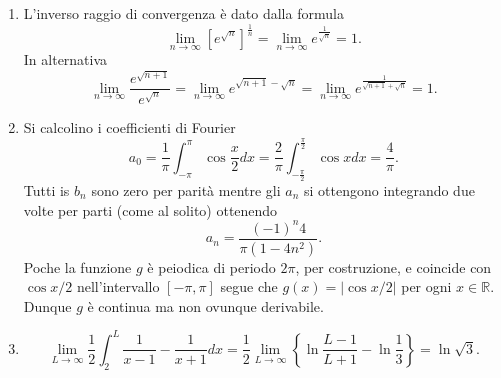 \documentclass{report}
\newcommand\R{{\mathbb R}}
\newcommand\Or{{\mathcal O}}
\begin{document}
\begin{enumerate}
Dunque
\begin{equation}\label{eq:f2}
\Delta(N,\infty)=\frac 1{2\sqrt N}+\frac 1{24 N^{\frac
32}}+\Or\left(\frac {27}{128 (N-1)^{\frac 52}}\right)
\end{equation}
per cui
\[
\Delta(16,\infty)=\frac 1{2\sqrt 16}+\frac 1{24\times 16^{\frac 32}}+{\mathcal
O}(2.5 \times 10^{-4})
\]
e, sommando a mano i primi quindici termini, si ottiene
\begin{equation}\label{eq:f3}
\Delta(1,\infty)=0.53965+{\mathcal O}(2.5 \times 10^{-4}).
\end{equation}
Finalmente, collezionando le uguaglianze \eqref{eq:f1}, \eqref{eq:f2},
\eqref{eq:f3}, possiamo scrivere 
\begin{align*}
\sum_{n=1}^N \frac 1{\sqrt n}=&2\sqrt{N+1}-2
+0.53965-\frac1{2\sqrt{N+1}}-\frac 1{24 (N+1)^{\frac 32}}\\
&\ +{\mathcal
O}(\frac{27}{128 N^{\frac 52}}+2.5 \times 10^{-4}) .
\end{align*}
Dunque si ha
\begin{align*}
\sum_{n=1}^{250730} \frac 1{\sqrt n}&=000.99958+{\mathcal O}(2.6\times 10^{-4})\\
\sum_{n=1}^{250731} \frac 1{\sqrt n}&=1000.0016+{\mathcal O}(2.6\times 10^{-4}) .
\end{align*}
Si pu\`o quindi affermare che l'intero per cui la somma \`e, per la prima volta, pi\`u
grande di 1000 \`e $\bar N=250731$.\footnote{Se volete una verifica
indipendente, potete scrivere un
piccolo programma (nel vostro linguaggio di programmazione preferito)
che trova $\bar N$ sommando e fermandosi quando la 
somma \`e maggiore di $1000$. Notate comunque che se invece di mille
il limite da superare fosse $10^9$ allora $\bar N$ sarebbe dell'ordine
di grandezza di $10^{18}$ e difficilmente un calcolatore potrebbe fare
$10^{18}$ estrazioni di radici quadrate, inversioni e somme nell'arco
della vostra vita, mentre una semplice sofisticazione del metodo sopra
descritto vi darebbe la risposta con poche ore di calcolo.}

\item L'inverso  raggio di convergenza \`e dato dalla formula
\[
\lim_{n\to \infty}[e^{\sqrt n}]^{\frac 1n}=\lim_{n\to \infty} e^{\frac
1{\sqrt n}}=1.
\]
In alternativa
\[
\lim_{n\to\infty} \frac{e^{\sqrt{n+1}}}{e^{\sqrt n}}=\lim_{n\to\infty}
e^{\sqrt{n+1}-\sqrt n} =\lim_{n\to\infty}e^{\frac1{\sqrt{n+1}+\sqrt
n}}=1.
\]
\item Si calcolino i coefficienti di Fourier
\[
a_0=\frac 1\pi\int_{-\pi}^\pi \cos\frac x2 dx=\frac 2\pi\int_{-\frac
\pi 2}^{\frac \pi 2}\cos x dx=\frac 4\pi.
\]
Tutti is $b_n$ sono zero per parit\`a mentre gli $a_n$ si ottengono
integrando due volte per parti (come al solito) ottenendo
\[
a_n=\frac {(-1)^n 4}{\pi (1-4n^2)}.
\]
Poche la funzione $g$ \`e peiodica di periodo $2\pi$, per costruzione,
e coincide con $\cos x/2$ nell'intervallo $[-\pi,\pi]$ segue che
$g(x)=|\cos x/2|$ per ogni $x\in \R$. Dunque $g$ \`e continua ma non
ovunque derivabile.
\item 
\[
\lim_{L\to\infty}\frac 12\int_2^L\frac 1{x-1}-\frac 1{x+1} dx=
\frac 12 \lim_{L\to\infty}\left \{\ln\frac{L-1}{L+1}-\ln\frac
13\right\}
=\ln\sqrt 3.
\]
\end{enumerate}
\end{document}
